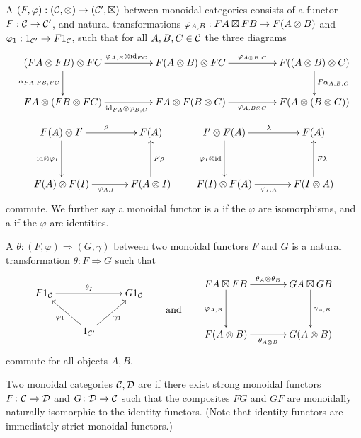 A  $(F, \varphi): ({\mathcal{C}},\otimes) \to ({\mathcal{C}}',\boxtimes)$
between monoidal categories consists of a functor $F: {\mathcal{C}} \to {\mathcal{C}}'$, and natural
transformations $\varphi_{A,B}: FA \boxtimes FB \to F(A \otimes B)$ and $\varphi_1:
1_{{\mathcal{C}}'} \to F1_{{\mathcal{C}}}$, such that for all $A,B,C \in {\mathcal{C}}$ the three diagrams
\[
  \xymatrixcolsep{4pc}
  \xymatrix{
    (FA \ot FB) \ot FC \ar[d]_{\a_{FA,FB,FC}} \ar[r]^{\varphi_{A,B} \ot \idn_{FC}} &
    F(A \ot B) \ot FC \ar[r]^{\varphi_{A\ot B,C}} & F((A \ot B) \ot C) \ar[d]^{F\a_{A,B,C}}\\
    FA \ot (FB \ot FC) \ar[r]_{\idn_{FA} \ot \varphi_{B,C}} & FA \ot F(B \ot C)
    \ar[r]_{\varphi_{A,B\ot C}} & F(A \ot (B \ot C))
  }
\]
\[
  \xymatrixcolsep{3pc}
  \xymatrixrowsep{3pc}
  \xymatrix{
    F(A) \ot I' \ar[d]_{\idn \ot \varphi_1} \ar[r]^{\rho} & F(A) \\
    F(A) \ot F(I) \ar[r]_{\varphi_{A,I}} & F(A \ot I) \ar[u]_{F\rho} 
  }
  \qquad
  \xymatrix{
    I' \ot F(A) \ar[d]_{\varphi_1 \ot \idn} \ar[r]^{\lambda} & F(A) \\
    F(I) \ot F(A) \ar[r]_{\varphi_{I,A}} & F(I \ot A) \ar[u]_{F\lambda} 
  }
\]
commute. We further say a monoidal functor is a 
if the $\varphi$ are isomorphisms, and a  if the
$\varphi$ are identities. 

A  $\theta: (F,\varphi) \Rightarrow
(G,\gamma)$ between two monoidal functors $F$ and $G$ is a natural
transformation $\theta: F \Rightarrow G$ such that
\[
  \begin{aligned}
    \xymatrix{
      F1_{\c} \ar[rr]^{\theta_I}&& G1_{\c} \\
      & 1_{\c'} \ar[ul]^{\varphi_1} \ar[ur]_{\gamma_1}
    } 
  \end{aligned} 
  \qquad 
  \mbox{and}
  \qquad
  \begin{aligned}
    \xymatrixcolsep{3pc}
    \xymatrixrowsep{3pc}
    \xymatrix{
      FA \boxtimes FB \ar[r]^{\theta_A \ot \theta_B} \ar[d]_{\varphi_{A,B}} 
      & GA \boxtimes GB \ar[d]^{\gamma_{A,B}}\\
      F(A \ot B) \ar[r]_{\theta_{A\ot B}} & G(A \ot B)
    }
  \end{aligned} 
\]
commute for all objects $A,B$.

Two monoidal categories $\mathcal C, \mathcal D$ are  if
there exist strong monoidal functors $F{\colon} \mathcal C \to \mathcal D$ and $G{\colon} \mathcal D
\to \mathcal C$ such that the composites $FG$ and $GF$ are monoidally naturally
isomorphic to the identity functors. (Note that identity functors are
immediately strict monoidal functors.)

